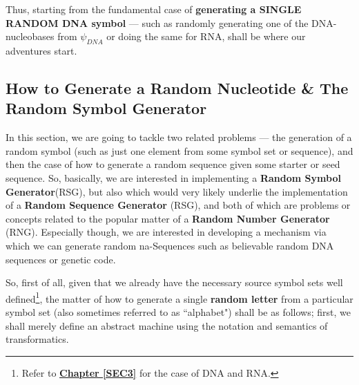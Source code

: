 \documentclass[a4paper, 18pt]{book} %
\begin{document}
Thus, starting from the fundamental case of \textbf{generating a SINGLE RANDOM DNA symbol} --- such as randomly generating one of the DNA-nucleobases from $\psi_{DNA}$ or doing the same for RNA, shall be where our adventures start.

\subsection{How to Generate a Random Nucleotide \& The Random Symbol Generator}

In this section, we are going to tackle two related problems --- the generation of a random symbol (such as just one element from some symbol set or sequence), and then the case of how to generate a random sequence given some starter or seed sequence. So, basically, we are interested in implementing a \textbf{Random Symbol Generator}(RSG), but also which would very likely underlie the implementation of a \textbf{Random Sequence Generator} (RSG), and both of which are problems or concepts related to the popular matter of a \textbf{Random Number Generator} (RNG). Especially though, we are interested in developing a mechanism via which we can generate random na-Sequences such as believable random DNA sequences or genetic code.

So, first of all, given that we already have the necessary source symbol sets well defined\footnote{Refer to \textbf{\hyperref[SEC3]{Chapter \ref{SEC3}}} for the case of DNA and RNA.}, the matter of how to generate a single \textbf{random letter} from a particular symbol set (also sometimes referred to as ``alphabet") shall be as follows; first, we shall merely define an abstract machine using the notation and semantics of transformatics.\\
\end{document}
